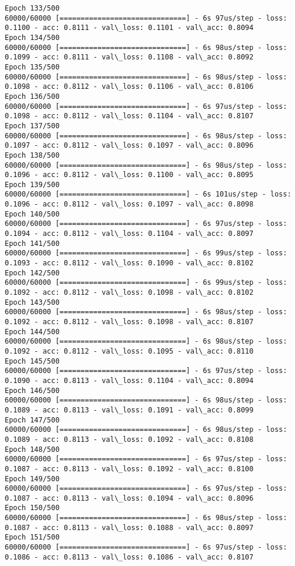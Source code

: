 \documentclass[11pt]{article}
\begin{document}
\begin{Verbatim}[commandchars=\\\{\}]
Epoch 133/500
60000/60000 [==============================] - 6s 97us/step - loss: 0.1100 - acc: 0.8111 - val\_loss: 0.1101 - val\_acc: 0.8094
Epoch 134/500
60000/60000 [==============================] - 6s 98us/step - loss: 0.1099 - acc: 0.8111 - val\_loss: 0.1108 - val\_acc: 0.8092
Epoch 135/500
60000/60000 [==============================] - 6s 98us/step - loss: 0.1098 - acc: 0.8112 - val\_loss: 0.1106 - val\_acc: 0.8106
Epoch 136/500
60000/60000 [==============================] - 6s 97us/step - loss: 0.1098 - acc: 0.8112 - val\_loss: 0.1104 - val\_acc: 0.8107
Epoch 137/500
60000/60000 [==============================] - 6s 98us/step - loss: 0.1097 - acc: 0.8112 - val\_loss: 0.1097 - val\_acc: 0.8096
Epoch 138/500
60000/60000 [==============================] - 6s 98us/step - loss: 0.1096 - acc: 0.8112 - val\_loss: 0.1100 - val\_acc: 0.8095
Epoch 139/500
60000/60000 [==============================] - 6s 101us/step - loss: 0.1096 - acc: 0.8112 - val\_loss: 0.1097 - val\_acc: 0.8098
Epoch 140/500
60000/60000 [==============================] - 6s 97us/step - loss: 0.1094 - acc: 0.8112 - val\_loss: 0.1104 - val\_acc: 0.8097
Epoch 141/500
60000/60000 [==============================] - 6s 99us/step - loss: 0.1093 - acc: 0.8112 - val\_loss: 0.1090 - val\_acc: 0.8102
Epoch 142/500
60000/60000 [==============================] - 6s 99us/step - loss: 0.1092 - acc: 0.8112 - val\_loss: 0.1098 - val\_acc: 0.8102
Epoch 143/500
60000/60000 [==============================] - 6s 98us/step - loss: 0.1092 - acc: 0.8112 - val\_loss: 0.1098 - val\_acc: 0.8107
Epoch 144/500
60000/60000 [==============================] - 6s 98us/step - loss: 0.1092 - acc: 0.8112 - val\_loss: 0.1095 - val\_acc: 0.8110
Epoch 145/500
60000/60000 [==============================] - 6s 97us/step - loss: 0.1090 - acc: 0.8113 - val\_loss: 0.1104 - val\_acc: 0.8094
Epoch 146/500
60000/60000 [==============================] - 6s 98us/step - loss: 0.1089 - acc: 0.8113 - val\_loss: 0.1091 - val\_acc: 0.8099
Epoch 147/500
60000/60000 [==============================] - 6s 98us/step - loss: 0.1089 - acc: 0.8113 - val\_loss: 0.1092 - val\_acc: 0.8108
Epoch 148/500
60000/60000 [==============================] - 6s 97us/step - loss: 0.1087 - acc: 0.8113 - val\_loss: 0.1092 - val\_acc: 0.8100
Epoch 149/500
60000/60000 [==============================] - 6s 97us/step - loss: 0.1087 - acc: 0.8113 - val\_loss: 0.1094 - val\_acc: 0.8096
Epoch 150/500
60000/60000 [==============================] - 6s 98us/step - loss: 0.1087 - acc: 0.8113 - val\_loss: 0.1088 - val\_acc: 0.8097
Epoch 151/500
60000/60000 [==============================] - 6s 97us/step - loss: 0.1086 - acc: 0.8113 - val\_loss: 0.1086 - val\_acc: 0.8107

\end{Verbatim}
\end{document}

